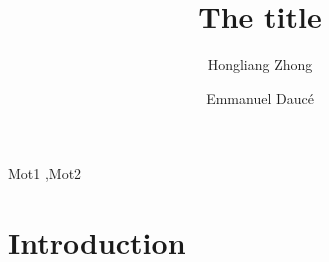 \documentclass[preprint,12pt,authoryear]{elsarticle}
\begin{document}
\begin{frontmatter}



\title{The title}


\author[centrale,lif]{Hongliang Zhong}
\author[centrale,ins]{Emmanuel Dauc\'e }

\address[centrale]{Ecole Centrale de Marseille}
\address[lif]{Laboratoire d'informatique Fondamentale}
\address[ins]{Institut de Neurosciences des Syst\`emes}


\begin{abstract}

\end{abstract}

\begin{keyword}
Mot1 \sep Mot2


\end{keyword}

\end{frontmatter}


\section{Introduction}
\label{sec:intro}
\end{document}
